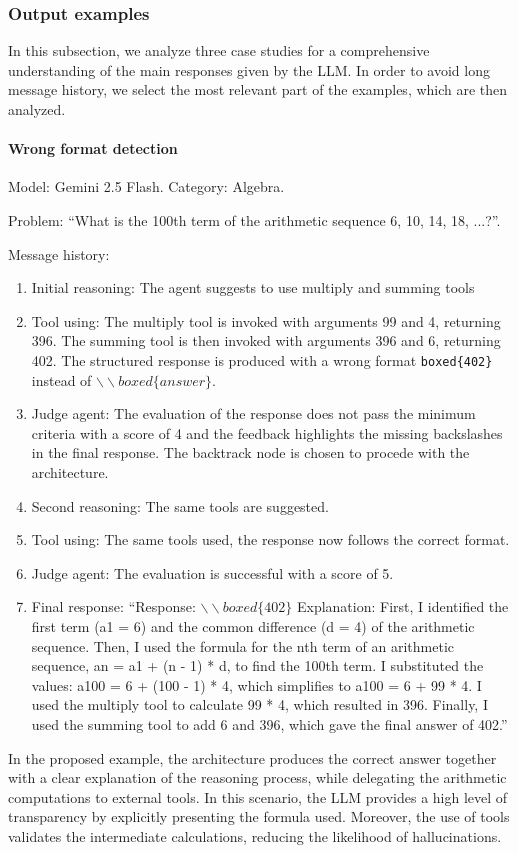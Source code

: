 \documentclass[12pt,a4paper,openright,twoside]{book}
\begin{document}
\subsubsection{Output examples}
In this subsection, we analyze three case studies for a comprehensive understanding of the main responses given by the \ac{LLM}.
In order to avoid long message history, we select the most relevant part of the examples, which are then analyzed. 

\paragraph{Wrong format detection} {Model: Gemini 2.5 Flash. Category: Algebra.

Problem: ``What is the 100th term of the arithmetic sequence 6, 10, 14, 18, ...?''.

Message history:
\begin{enumerate}
    \item Initial reasoning: The agent suggests to use multiply and summing tools
    \item Tool using: The multiply tool is invoked with arguments 99 and 4, returning 396. The summing tool is then invoked with arguments 396 and 6, returning 402. 
    The structured response is produced with a wrong format \texttt{boxed\{402\}} instead of \texttt{$\backslash\backslash boxed\{answer\}$}.
    \item Judge agent: The evaluation of the response does not pass the minimum criteria with a score of 4 and the feedback highlights the missing backslashes in the final response. 
    The backtrack node is chosen to procede with the architecture.
    \item Second reasoning: The same tools are suggested.
    \item Tool using: The same tools used, the response now follows the correct format.
    \item Judge agent: The evaluation is successful with a score of 5.
    \item Final response: ``Response: $\backslash\backslash boxed\{402\}$ Explanation: First, I identified the first term (a1 = 6) and the common difference (d = 4) of the arithmetic sequence. Then, I used the formula for the nth term of an arithmetic sequence, an = a1 + (n - 1) * d, to find the 100th term. I substituted the values: a100 = 6 + (100 - 1) * 4, which simplifies to a100 = 6 + 99 * 4. I used the multiply tool to calculate 99 * 4, which resulted in 396. Finally, I used the summing tool to add 6 and 396, which gave the final answer of 402.'' 
\end{enumerate}
In the proposed example, the architecture produces the correct answer together with a clear explanation of the reasoning process, while delegating the arithmetic computations to external tools. 
In this scenario, the \ac{LLM} provides a high level of transparency by explicitly presenting the formula used. 
Moreover, the use of tools validates the intermediate calculations, reducing the likelihood of hallucinations.
}
\end{document}
